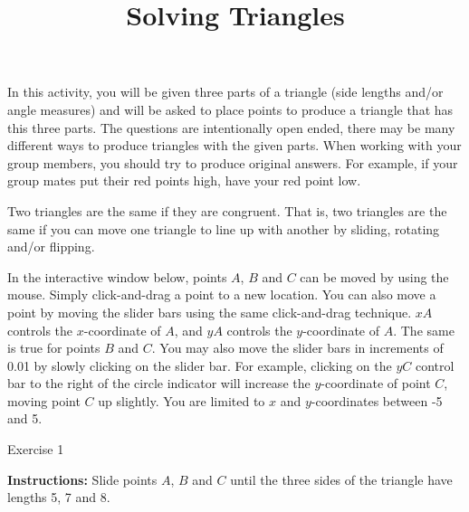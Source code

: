 \documentclass[number]{ximera}
\title{Solving Triangles}
\begin{document}
\begin{abstract}
\end{abstract}
\maketitle



In this activity, you will be given three parts of a triangle (side lengths and/or angle measures) and will be asked to place points to produce a triangle that has this three parts. The questions are intentionally open ended, there may be many different ways to produce triangles with the given parts. When working with your group members, you should try to produce original answers. For example, if your group mates put their red points high, have your red point low.

Two triangles are the same if they are congruent. That is, two triangles are the same if you can move one triangle to line up with another by sliding, rotating and/or flipping.

In the interactive window below, points $A$, $B$ and $C$ can be moved by using the mouse. Simply click-and-drag a point to a new location. You can also move a point by moving the slider bars using the same click-and-drag technique. $xA$ controls the $x$-coordinate of $A$, and $yA$ controls the $y$-coordinate of $A$. The same is true for points $B$ and $C$. You may also move the slider bars in increments of 0.01 by slowly clicking on the slider bar. For example, clicking on the $yC$ control bar to the right of the circle indicator will increase the $y$-coordinate of point $C$, moving point $C$ up slightly. You are limited to $x$ and $y$-coordinates between -5 and 5. 

Exercise 1

{\bf {Instructions:}} Slide points $A$, $B$ and $C$ until the three sides of the triangle have lengths 5, 7 and 8. 


\end{document}

